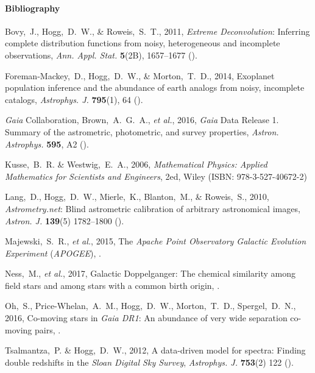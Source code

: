 \documentclass[12pt,letterpaper]{article}
\newcommand{\foreign}[1]{\textsl{#1}}
\newcommand{\project}[1]{\textsl{#1}}
\newcommand{\acronym}[1]{{\small{#1}}}
\newcommand{\etal}{\foreign{et al.}}
\begin{document}
\paragraph{Bibliography}
\begin{list}{}{\itemsep=0pt \parskip=0pt \parsep=0pt \leftmargin=\parindent \itemindent=-\parindent}
\item Bovy,~J., Hogg,~D.~W., \& Roweis,~S.~T., 2011,
  \project{Extreme Deconvolution}: Inferring complete distribution functions from noisy, heterogeneous and incomplete observations,
  \textit{Ann. Appl. Stat.} \textbf{5}(2B), 1657--1677 ().
\item Foreman-Mackey,~D., Hogg,~D.~W., \& Morton,~T.~D., 2014,
  Exoplanet population inference and the abundance of earth analogs from noisy, incomplete catalogs,
  \textit{Astrophys. J.} \textbf{795}(1), 64 ().
\item \project{Gaia} Collaboration, Brown,~A.~G.~A., \etal, 2016,
  \project{Gaia} Data Release 1. Summary of the astrometric, photometric, and survey properties,
  \textit{Astron. Astrophys.} \textbf{595}, A2 ().
\item Kusse,~B.~R. \& Westwig,~E.~A., 2006,
  \textit{Mathematical Physics: Applied Mathematics for Scientists and Engineers},
  2ed, Wiley (\acronym{ISBN}: 978-3-527-40672-2)
\item Lang,~D., Hogg,~D.~W., Mierle,~K., Blanton,~M., \& Roweis,~S., 2010,
  \project{Astrometry.net}: Blind astrometric calibration of arbitrary astronomical images,
  \textit{Astron. J.} \textbf{139}(5) 1782--1800 ().
\item Majewski,~S.~R., \etal, 2015,
  The \project{Apache Point Observatory Galactic Evolution Experiment} (\project{\acronym{APOGEE}}),
  .
\item Ness,~M., \etal, 2017,
  Galactic Doppelganger: The chemical similarity among field stars and among stars with a common birth origin,
  .
\item Oh,~S., Price-Whelan,~A.~M., Hogg,~D.~W., Morton,~T.~D., Spergel,~D.~N., 2016,
  Co-moving stars in \project{Gaia DR1}: An abundance of very wide separation co-moving pairs,
  .
\item Tsalmantza,~P. \& Hogg,~D.~W., 2012,
  A data-driven model for spectra: Finding double redshifts in the \project{Sloan Digital Sky Survey},
  \textit{Astrophys. J.} \textbf{753}(2) 122 ().
\end{list}
\end{document}
